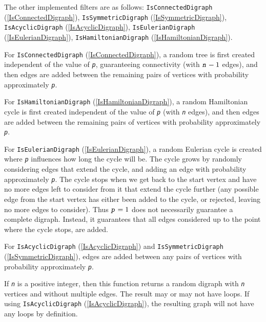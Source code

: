 \documentclass[a4paper,11pt]{report}
\begin{document}
{{{ The other implemented filters are as follows: \texttt{IsConnectedDigraph} (\ref{IsConnectedDigraph}), \texttt{IsSymmetricDigraph} (\ref{IsSymmetricDigraph}), \texttt{IsAcyclicDigraph} (\ref{IsAcyclicDigraph}), \texttt{IsEulerianDigraph} (\ref{IsEulerianDigraph}), \texttt{IsHamiltonianDigraph} (\ref{IsHamiltonianDigraph}).

 For \texttt{IsConnectedDigraph} (\ref{IsConnectedDigraph}), a random tree is first created independent of the value of \mbox{\texttt{\mdseries\slshape p}}, guaranteeing connectivity (with $\mbox{\texttt{\mdseries\slshape n}}-1$ edges), and then edges are added between the remaining pairs of vertices with
probability approximately \mbox{\texttt{\mdseries\slshape p}}.

 For \texttt{IsHamiltonianDigraph} (\ref{IsHamiltonianDigraph}), a random Hamiltonian cycle is first created independent of the value of \mbox{\texttt{\mdseries\slshape p}} (with \mbox{\texttt{\mdseries\slshape n}} edges), and then edges are added between the remaining pairs of vertices with
probability approximately \mbox{\texttt{\mdseries\slshape p}}.

 For \texttt{IsEulerianDigraph} (\ref{IsEulerianDigraph}), a random Eulerian cycle is created where \mbox{\texttt{\mdseries\slshape p}} influences how long the cycle will be. The cycle grows by randomly considering
edges that extend the cycle, and adding an edge with probability approximately \mbox{\texttt{\mdseries\slshape p}}. The cycle stops when we get back to the start vertex and have no more edges
left to consider from it that extend the cycle further (any possible edge from
the start vertex has either been added to the cycle, or rejected, leaving no
more edges to consider). Thus $\mbox{\texttt{\mdseries\slshape p}} = 1$ does not necessarily guarantee a complete digraph. Instead, it guarantees that
all edges considered up to the point where the cycle stops, are added.

 For \texttt{IsAcyclicDigraph} (\ref{IsAcyclicDigraph}) and \texttt{IsSymmetricDigraph} (\ref{IsSymmetricDigraph}), edges are added between any pairs of vertices with probability approximately \mbox{\texttt{\mdseries\slshape p}}.

 If \mbox{\texttt{\mdseries\slshape n}} is a positive integer, then this function returns a random digraph with \mbox{\texttt{\mdseries\slshape n}} vertices and without multiple edges. The result may or may not have loops. If
using \texttt{IsAcyclicDigraph} (\ref{IsAcyclicDigraph}), the resulting graph will not have any loops by definition.

}}}
\end{document}
